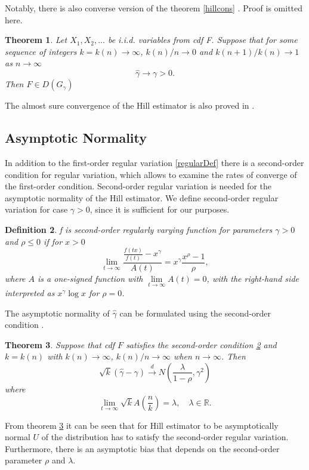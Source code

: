 \documentclass[english,12pt,a4paper,pdftex,sci,utf8]{aaltothesis} %
\newtheorem{theorem}{Theorem}[section]
\newtheorem{definition}[theorem]{Definition}
\begin{document}
Notably, there is also converse version of the theorem \ref{hillcons} \cite{mason}. Proof is omitted here.

\begin{theorem}
Let $X_1, X_2,...$ be i.i.d. variables from cdf F. Suppose that for some sequence of integers $k=k(n) \rightarrow \infty$, $k(n)/n \rightarrow 0$ and $k(n+1)/k(n) \rightarrow 1$ as $n \rightarrow \infty$
\begin{equation*}
\hat{\gamma} \rightarrow \gamma > 0.
\end{equation*}
Then $F \in D(G_{\gamma})$
\end{theorem}

The almost sure convergence of the Hill estimator is also proved in \cite{mason}.

\subsection{Asymptotic Normality}


In addition to the first-order regular variation \ref{regularDef} there is a second-order condition for regular variation, which allows to examine the rates of converge of the first-order condition. Second-order regular variation is needed for the asymptotic normality of the Hill estimator. We define second-order regular variation for case $\gamma > 0$, since it is sufficient for our purposes.

\begin{definition}
f is second-order regularly varying function for parameters $\gamma>0$ and $\rho \leq 0$ if for $x>0$
\begin{equation*}
\lim_{t \rightarrow \infty} \frac{\frac{f(tx)}{f(t)}-x^{\gamma}}{A(t)} = x^{\gamma} \frac{x^{\rho}-1}{\rho},
\end{equation*}
where $A$ is a one-signed function with $\lim\limits_{t \rightarrow \infty} A(t)=0$, with the right-hand side interpreted as $x^\gamma \log x$ for $\rho = 0$.
\label{2RV}
\end{definition}


The asymptotic normality of $\hat{\gamma}$ can be formulated using the second-order condition \cite{peng}.

\begin{theorem}
Suppose that cdf $F$ satisfies the second-order condition \ref{2RV} and $k=k(n)$ with $k(n)\rightarrow \infty$, $k(n)/n \rightarrow \infty$ when $n\rightarrow \infty$. Then
\begin{equation*}
\sqrt{k}(\hat{\gamma} - \gamma) \xrightarrow{d} N \left( \frac{\lambda}{1- \rho}, \gamma^2 \right)
\end{equation*}
where
\begin{equation*}
\lim_{t \rightarrow \infty} \sqrt{k}A \left(\frac{n}{k} \right) = \lambda, \quad \lambda \in \mathbb{R}.
\end{equation*}
\label{normality}
\end{theorem}
From theorem \ref{normality} it can be seen that for Hill estimator to be asymptotically normal $U$ of the distribution has to satisfy the second-order regular variation. Furthermore, there is an asymptotic bias that depends on the second-order parameter $\rho$ and $\lambda$.
\end{document}
